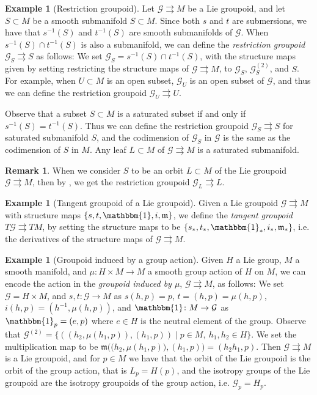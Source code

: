 \documentclass[12pt,a4paper,reqno]{amsart}
\newcommand{\1}{\mathbbm{1}} %
\newcommand{\G}{\mathcal{G}} %
\newcommand{\m}{\mathfrak{m}} %
\theoremstyle{definition}
\newtheorem{remark}[thm]{Remark}
\newtheorem{example}[thm]{Example}
\theoremstyle{TheoremNum}
\begin{document}
\begin{example}[Restriction groupoid]
Let $\G\rightrightarrows M$ be a Lie groupoid, and let $S\subset M$ be a smooth submanifold $S\subset M$.  Since both $s$ and $t$ are submersions, we have that $s^{-1}(S)$ and $t^{-1}(S)$ are smooth submanifolds of $\G$. When $s^{-1}(S)\cap t^{-1}(S)$ is also a submanifold,  we can define the \emph{restriction groupoid} $\G_S\rightrightarrows S$ as follows: We set $\G_S = s^{-1}(S)\cap t^{-1}(S)$, with the structure maps given by setting  restricting the structure maps of $\G\rightrightarrows M$, to $\G_S$, $\G_S^{(2)}$, and $S$. For example, when  $U\subset M$ is an open subset,  $\G_U$ is an open subset of $\G$, and thus we can define the  restriction groupoid  $\G_U\rightrightarrows U$.

Observe that a subset  $S\subset M$  is a saturated subset if and only if  $s^{-1}(S)=t^{-1}(S)$. Thus we can define the restriction groupoid $\G_S\rightrightarrows S$ for saturated submanifold $S$, and the codimension of $\G_S$ in $\G$ is the same as the codimension of $S$ in $M$. Any leaf $L\subset M$ of $\G\rightrightarrows M$ is a saturated submanifold.
\end{example}

\begin{remark}
When we consider $S$ to be an orbit $L\subset M$ of the Lie groupoid $\G\rightrightarrows M$, then by \cite[Section 3.4]{delHoyo2013}, we get the restriction groupoid $\G_L\rightrightarrows L$.
\end{remark}

\begin{example}[Tangent groupoid of a Lie groupoid]
Given a Lie groupoid $\G\rightrightarrows M$ with structure maps $\{s,t,\1,i,\m\}$, we define the \emph{tangent groupoid} $T\G\rightrightarrows TM$, by setting the structure maps to be $\{s_\ast,t_\ast,\1_\ast,i_\ast,\m_\ast\}$, i.e. the derivatives of the structure maps of $\G\rightrightarrows M$. 
\end{example}

\begin{example}[Groupoid induced by a group action]
Given $H$ a Lie group, $M$ a smooth manifold, and $\mu\colon H\times M\to M$ a smooth  group action of $H$ on $M$, we can encode the action in the \emph{groupoid induced by $\mu$},  $\G\rightrightarrows M$, as follows: We set $\G = H\times M$, and $s,t\colon \G\to M$ as $s(h,p) = p$, $t = (h,p) = \mu(h,p)$,  $i(h,p) = (h^{-1},\mu(h,p))$, and $\1\colon M\to \G$ as $\1_p = (e,p)$ where $e\in H$ is the neutral element of the group. Observe that $\G^{(2)} = \{((h_2,\mu(h_1,p)),(h_1,p))\mid p\in M,\ h_1,h_2\in H\}$. We set the multiplication map to be $\m \Big(\big(h_2,\mu(h_1,p)\big),(h_1,p)\Big) = (h_2h_1,p)$. Then $\G\rightrightarrows M$ is a Lie groupoid, and for $p\in M$ we have that the orbit of the Lie groupoid is the orbit of the group action, that is $L_p = H(p)$, and the isotropy groups of the Lie groupoid are the isotropy groupoids of the group action, i.e. $\G_p = H_p$. 
\end{example}
\end{document}
